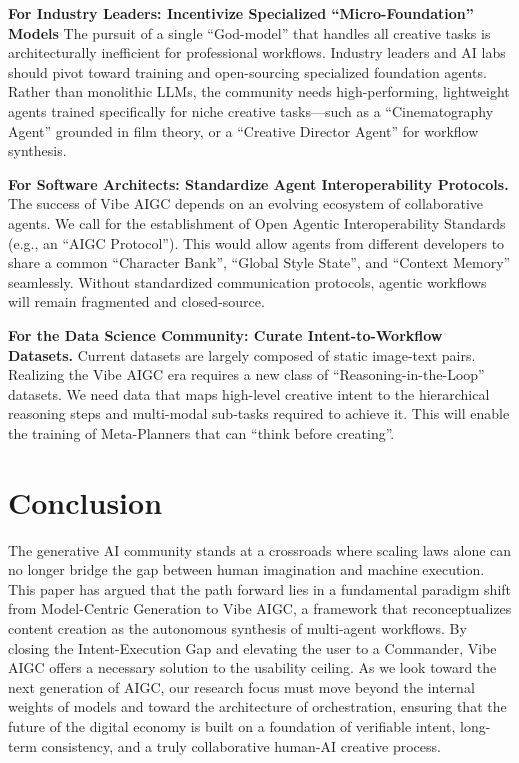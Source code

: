 \documentclass{article}
\begin{document}
\noindent\textbf{For Industry Leaders: Incentivize Specialized ``Micro-Foundation'' Models}
The pursuit of a single ``God-model'' that handles all creative tasks is architecturally inefficient for professional workflows. Industry leaders and AI labs should pivot toward training and open-sourcing specialized foundation agents. Rather than monolithic LLMs, the community needs high-performing, lightweight agents trained specifically for niche creative tasks—such as a ``Cinematography Agent'' grounded in film theory, or a ``Creative Director Agent'' for workflow synthesis.

\noindent\textbf{For Software Architects: Standardize Agent Interoperability Protocols.}
The success of Vibe AIGC depends on an evolving ecosystem of collaborative agents. We call for the establishment of Open Agentic Interoperability Standards (e.g., an ``AIGC Protocol''). This would allow agents from different developers to share a common ``Character Bank'', ``Global Style State'', and ``Context Memory'' seamlessly. Without standardized communication protocols, agentic workflows will remain fragmented and closed-source.

\noindent\textbf{For the Data Science Community: Curate Intent-to-Workflow Datasets.}
Current datasets are largely composed of static image-text pairs. Realizing the Vibe AIGC era requires a new class of ``Reasoning-in-the-Loop'' datasets. We need data that maps high-level creative intent to the hierarchical reasoning steps and multi-modal sub-tasks required to achieve it. This will enable the training of Meta-Planners that can ``think before creating''.



\section{Conclusion}
The generative AI community stands at a crossroads where scaling laws alone can no longer bridge the gap between human imagination and machine execution. This paper has argued that the path forward lies in a fundamental paradigm shift from Model-Centric Generation to Vibe AIGC, a framework that reconceptualizes content creation as the autonomous synthesis of multi-agent workflows. 
By closing the Intent-Execution Gap and elevating the user to a Commander, Vibe AIGC offers a necessary solution to the usability ceiling.
As we look toward the next generation of AIGC, our research focus must move beyond the internal weights of models and toward the architecture of orchestration, ensuring that the future of the digital economy is built on a foundation of verifiable intent, long-term consistency, and a truly collaborative human-AI creative process.


 
\end{document}
